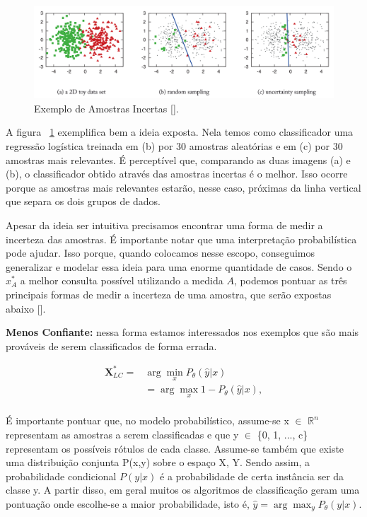 \begin{figure}
  \centering
  \includegraphics[width=1.0\textwidth]{figures/settles_2014_uncertainty_sampling_example.png}
  \caption{Exemplo de Amostras Incertas [\cite{settles2014active}].}
  \label{fig:settles_2014_uncertainty_example}
\end{figure}

A figura ~\ref{fig:settles_2014_uncertainty_example} exemplifica bem a ideia exposta. Nela temos como classificador uma regressão logística treinada em (b) por 30 amostras aleatórias e em (c) por 30 amostras mais relevantes. É perceptível que, comparando as duas imagens (a) e (b), o classificador obtido através das amostras incertas é o melhor. Isso ocorre porque as amostras mais relevantes estarão, nesse caso, próximas da linha vertical que separa os dois grupos de dados.

Apesar da ideia ser intuitiva precisamos encontrar uma forma de medir a incerteza das amostras. É importante notar que uma interpretação probabilística pode ajudar. Isso porque, quando colocamos nesse escopo, conseguimos generalizar e modelar essa ideia para uma enorme quantidade de casos. Sendo o $x^*_{A}$ a melhor consulta possível utilizando a medida $A$, podemos pontuar as três principais formas de medir a incerteza de uma amostra, que serão expostas abaixo [\cite{settles2014active}].


\textbf{Menos Confiante:} nessa forma estamos interessados nos exemplos que são mais prováveis de serem classificados de forma errada. 

\begin{align*}
\textbf{X}^*_{LC} = &\arg\min_{x} P_{\theta}  (\hat{y}\lvert x)\\
& = \arg\max_{x} 1 - P_{\theta}  (\hat{y}\lvert x),\\
\end{align*}

É importante pontuar que, no modelo probabilístico, assume-se x $\in$ $\mathbb{R}^n$ representam as amostras a serem classificadas e que y $\in$ \{0, 1, ..., c\} representam os possíveis rótulos de cada classe. Assume-se também que existe uma distribuição conjunta P(x,y) sobre o espaço X, Y. Sendo assim, a probabilidade condicional $P(y\lvert x)$ é a probabilidade de certa instância ser da classe y. A partir disso, em geral muitos os algoritmos de classificação geram uma pontuação onde escolhe-se a maior probabilidade, isto é, $\hat{y} = \arg\max_{y} P_{\theta} (y\lvert x)$.

